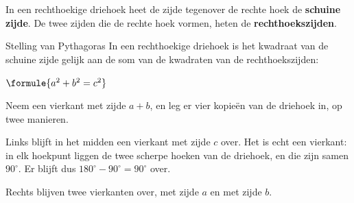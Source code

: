 \begin{theorie}
\begin{minipage}[t]{.62\linewidth}
\vspace{0pt}
In een rechthoekige driehoek heet de zijde tegenover de rechte hoek de \textbf{\textcolor{accent}{schuine zijde}}. De twee zijden die de rechte hoek vormen, heten de \textbf{\textcolor{accent}{rechthoekszijden}}.

\begin{stelling}{Stelling van Pythagoras}
In een rechthoekige driehoek is het kwadraat van de schuine zijde gelijk aan de som van de kwadraten van de rechthoekszijden:

\vspace{1mm}
\qquad $\formule{a^2 + b^2 = c^2}$
\end{stelling}
\end{minipage}\hfill
\begin{minipage}[t]{.34\linewidth}
\vspace{2mm}
\centering
{}
\end{minipage}

\begin{bewijs}
\begin{minipage}[t]{.56\linewidth}
\vspace{0pt}
Neem een vierkant met zijde $a + b$, en leg er vier kopieën van de driehoek in, op twee manieren.

Links blijft in het midden een vierkant met zijde $c$ over. Het is echt een vierkant: in elk hoekpunt liggen de twee scherpe hoeken van de driehoek, en die zijn samen $90^\circ$. Er blijft dus $180^\circ - 90^\circ = 90^\circ$ over.

Rechts blijven twee vierkanten over, met zijde $a$ en met zijde $b$.


\end{minipage}
\end{bewijs}
\end{theorie}
